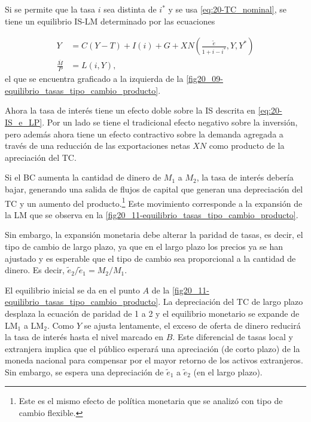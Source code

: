 \documentclass[DeGregorioResumen]{subfiles}
\begin{document}
Si se permite que la tasa $i$ sea distinta de $i^*$ y se usa \eqref{eq:20-TC_nominal}, se tiene un equilibrio IS-LM determinado por las ecuaciones

\begin{align}
	Y &= C(Y-T) + I(i) + G + XN\left(\frac{\tilde e}{1+i-i^*}, Y, Y^*\right) \label{eq:20-IS_e_LP} \\
	\frac{\overline M}{P} &= L(i, Y),
\label{eq:20-LM_e_LP}
\end{align}
el que se encuentra graficado a la izquierda de la \autoref{fig20_09-equilibrio_tasas_tipo_cambio_producto}.

Ahora la tasa de interés tiene un efecto doble sobre la IS descrita en \eqref{eq:20-IS_e_LP}. Por un lado se tiene el tradicional efecto negativo sobre la inversión, pero además ahora tiene un efecto contractivo sobre la demanda agregada a través de una reducción de las exportaciones netas $XN$ como producto de la apreciación del TC.


Si el BC aumenta la cantidad de dinero de $M_1$ a $M_2$, la tasa de interés debería bajar, generando una salida de flujos de capital que generan una depreciación del TC y un aumento del producto.\footnote{Este es el mismo efecto de política monetaria que se analizó con tipo de cambio flexible.} Este movimiento corresponde a la expansión de la LM que se observa en la \autoref{fig20_11-equilibrio_tasas_tipo_cambio_producto}.



Sin embargo, la expansión monetaria debe alterar la paridad de tasas, es decir, el tipo de cambio de largo plazo, ya que en el largo plazo los precios ya se han ajustado y es esperable que el tipo de cambio sea proporcional a la cantidad de dinero. Es decir, $\tilde e_2/\tilde e_1 = M_2/M_1$.

El equilibrio inicial se da en el punto $A$ de la \autoref{fig20_11-equilibrio_tasas_tipo_cambio_producto}. La depreciación del TC de largo plazo desplaza la ecuación de paridad de 1 a 2 y el equilibrio monetario se expande de LM$_1$ a LM$_2$. Como $Y$ se ajusta lentamente, el exceso de oferta de dinero reducirá la tasa de interés hasta el nivel marcado en $B$. Este diferencial de tasas local y extranjera implica que el público esperará una apreciación (de corto plazo) de la moneda nacional para compensar por el mayor retorno de los activos extranjeros. Sin embargo, se espera una depreciación de $\tilde e_1$ a $\tilde e_2$ (en el largo plazo).
\end{document}
